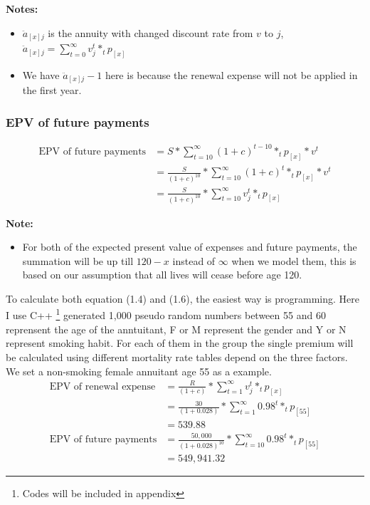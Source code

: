 \documentclass{report}
\begin{document}
\textbf{Notes:}
\begin{itemize}
\item $\ddot{a}_{[x]j}$ is the annuity with changed discount rate from $v$ to $j$,  $\ddot{a}_{[x]j} = \sum_{t=0}^{\infty} v_j^t * _tp_{[x]}$
\item We have $\ddot{a}_{[x]j} - 1$ here is because the renewal expense will not be applied in the first year.
\end{itemize}

\subsubsection{EPV of future payments}
\begin{align}
        \text{EPV of future payments} &= S * \sum_{t=10}^{\infty} (1 + c )^{t-10} * _tp_{[x]} * v^t \nonumber \\
         &= \frac{S}{(1+c)^{10}}* \sum_{t=10}^{\infty} (1 + c )^{t} * _tp_{[x]} * v^t \nonumber \\
         &= \frac{S}{(1+c)^{10}} * \sum_{t=10}^{\infty} v_j^t * _tp_{[x]}
\end{align}

\textbf{Note:}
\begin{itemize}
\item For both of the expected present value of expenses and future payments, the summation will be up till $120-x$ instead of $\infty$ when we model them, this is based on our assumption that all lives will cease before age 120. 
\end{itemize}



To calculate both equation (1.4) and (1.6), the easiest way is programming. Here I use C++ \footnote{Codes will be included in appendix} generated 1,000 pseudo random numbers between 55 and 60 reprensent the age of the anntuitant, F or M represent the gender and Y or N represent smoking habit. For each of them in the group the single premium will be calculated using different mortality rate tables depend on the three factors. We set a non-smoking female annuitant age 55 as a example.
\begin{align}
        \text{EPV of renewal expense}&= \frac{R}{(1+c)} * \sum_{t=1}^{\infty} v_j^t * _tp_{[x]} \nonumber \\
         &= \frac{30}{(1+0.028)} * \sum_{t=1}^{\infty} 0.98^t * _tp_{[55]} \nonumber\\
         &= 539.88\nonumber\\
        \text{EPV of future payments} &= \frac{50,000}{(1+0.028)^{10}} * \sum_{t=10}^{\infty} 0.98^t * _tp_{[55]} \nonumber\\ 
         &=549,941.32 \nonumber
\end{align}
\end{document}
